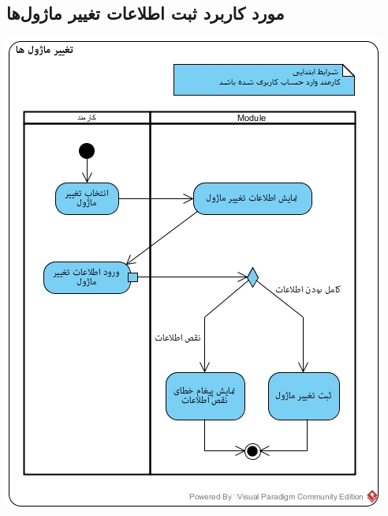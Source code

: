 \subsection*{مورد کاربرد ثبت اطلاعات تغییر ماژول‌ها}
\vspace{2cm}
\begin{center}
\includegraphics[width=\textwidth]{ActivityDiagramsWithSwimlanes/28.jpg}
\end{center}

\newpage
\vspace{2cm}
